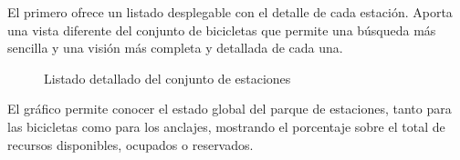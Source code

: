 El primero ofrece un listado desplegable con el detalle de cada estación. Aporta una vista diferente del conjunto de bicicletas que permite una búsqueda más sencilla y una visión más completa y detallada de cada una.

\begin{figure} [!htb]
	\centering
	\caption{Listado detallado del conjunto de estaciones}
	\label{fig:listadoEstaciones}
\end{figure}

El gráfico permite conocer el estado global del parque de estaciones, tanto para las bicicletas como para los anclajes, mostrando el porcentaje sobre el total de recursos disponibles, ocupados o reservados.

